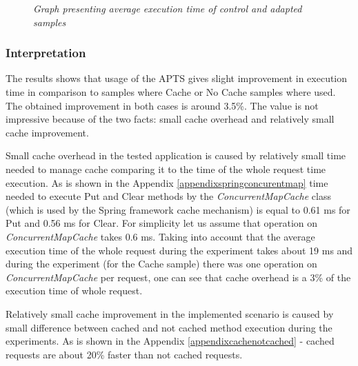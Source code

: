\documentclass[10pt,a4paper]{article}
\begin{document}
\begin{figure}[!htb]
\centering
{}
\caption{\textit{Graph presenting average execution time of control and adapted samples}} \label{cacheEvalResutlsGraph}
\end{figure}


\subsubsection{Interpretation} 

The results shows that usage of the APTS gives slight improvement in execution time in comparison to samples where Cache or No Cache samples where used. The obtained improvement in both cases is around 3.5\%. The value is not impressive because of the two facts: small cache overhead and relatively small cache improvement. 

Small cache overhead in the tested application is caused by relatively small time needed to manage cache comparing it to the time of the whole request time execution. As is shown in the Appendix \ref{appendixspringconcurentmap} time needed to execute Put and Clear methods by the \textit{ConcurrentMapCache} class (which is used by the Spring framework cache mechanism) is equal to 0.61 ms for Put and 0.56 ms for Clear. For simplicity let us assume that operation on \textit{ConcurrentMapCache} takes 0.6 ms. Taking into account that the average execution time of the whole request during the experiment takes about 19 ms and during the experiment (for the Cache sample) there was one operation on \textit{ConcurrentMapCache} per request, one can see that cache overhead is a 3\% of the execution time of whole request.  

Relatively small cache improvement in the implemented scenario is caused by small difference between cached and not cached method execution during the experiments. As is shown in the Appendix \ref{appendixcachenotcached} - cached requests are about 20\% faster than not cached requests. 
\end{document}
